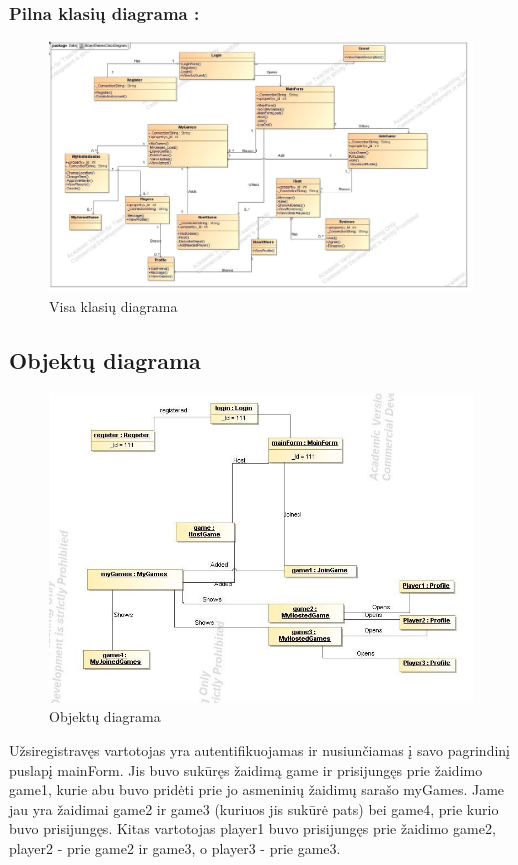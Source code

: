 \documentclass{VUMIFPSkursinis}
\begin{document}
		\subsubsection*{Pilna klasių diagrama :}
			\begin{figure}[H]
				\centering
				\includegraphics[scale=0.4]{img/BoardGamesClassDiagramFull}
				\caption{Visa klasių diagrama}
				\label{img:BoardGamesClassDiagramFull}
			\end{figure}
	\subsection{Objektų diagrama}
		\begin{figure}[H]
				\centering
				\includegraphics[scale=0.5]{img/Object}
				\caption{Objektų diagrama}
				\label{img:Object}
			\end{figure}
		Užsiregistravęs vartotojas yra autentifikuojamas ir nusiunčiamas į savo pagrindinį puslapį mainForm. Jis buvo sukūręs žaidimą game ir prisijungęs prie žaidimo game1, kurie abu buvo pridėti prie jo asmeninių žaidimų sarašo myGames. Jame jau yra žaidimai game2 ir game3 (kuriuos jis sukūrė pats) bei game4, prie kurio buvo prisijungęs. Kitas vartotojas player1 buvo prisijungęs prie žaidimo game2, player2 - prie game2 ir game3, o player3 - prie game3.
\end{document}

